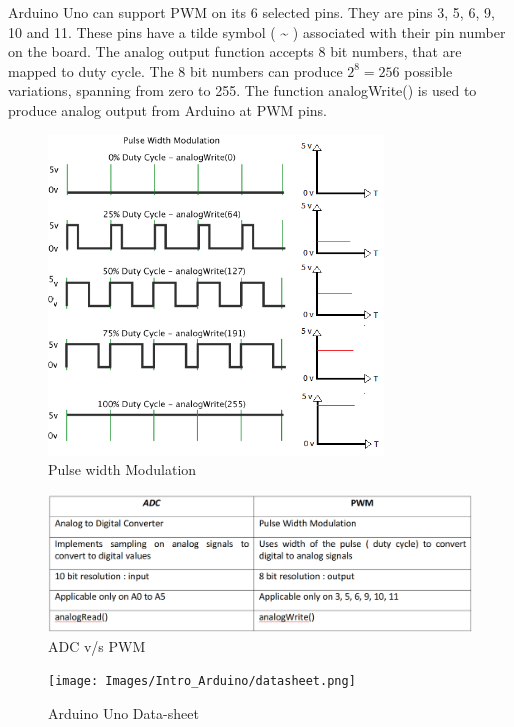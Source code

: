 \par Arduino Uno can support \ac{PWM} on its 6 selected pins. They are pins 3, 5, 6, 9, 10 and 11. These pins have a tilde symbol ( \textasciitilde{} ) associated with their pin number on the board. The analog output function accepts 8 bit numbers, that are mapped to duty cycle. The 8 bit numbers can produce $2^8=256$ possible variations, spanning from zero to 255. The function analogWrite() is used to  produce analog output from Arduino at \ac{PWM} pins.

\begin{figure}
 \centering 
 \includegraphics[width=3.5in]{Images/Intro_Arduino/pwm.png}
 \caption{Pulse width Modulation}
\end{figure}

\begin{figure}
 \centering
 \includegraphics{Images/Intro_Arduino/cmp_adc_pwm.png}
 \caption{ADC v/s PWM}
\end{figure}

\newpage
\begin{figure}
    \centering
    \texttt{[image: Images/Intro\_Arduino/datasheet.png]}
    \caption{Arduino Uno Data-sheet}
\end{figure}









